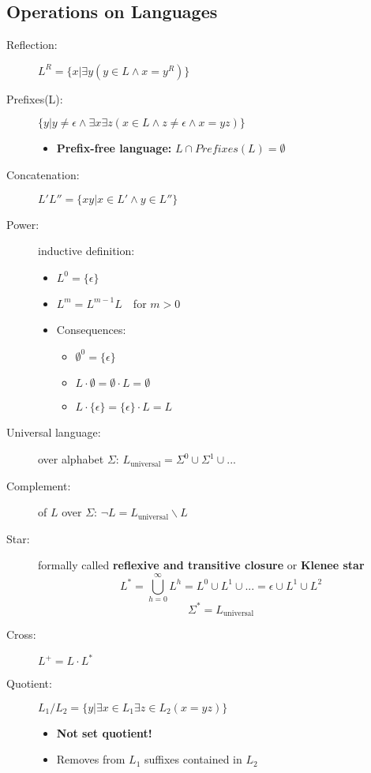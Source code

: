 \documentclass{article}
\begin{document}
\subsection{Operations on Languages}
\begin{description}
\item[Reflection:] $L^R=\{ x|\exists y\left(y\in L \wedge x=y^R\right)\}$
\item[Prefixes(L):] $\{y|y\neq \epsilon \wedge \exists x \exists z \left(x \in L \wedge z \neq \epsilon \wedge x=yz \right)\}$
	\begin{itemize}
	\item \textbf{Prefix-free language: } $L \cap Prefixes(L)=\emptyset$
	\end{itemize}
\item[Concatenation:] $L'L''=\{xy|x \in L' \wedge y \in L''\}$
\item[Power:] inductive definition:
	\begin{itemize}
	\item $L^0=\{\epsilon\}$
	\item $L^m=L^{m-1}L	\quad$for $m>0$
	\item Consequences:
		\begin{itemize}
		\item $\emptyset ^0=\{\epsilon\}$
		\item $L \cdot \emptyset = \emptyset \cdot L = \emptyset$
		\item $L \cdot \{\epsilon\} = \{\epsilon\} \cdot L = L$
		\end{itemize}
	\end{itemize}
\item [Universal language:] over alphabet $\Sigma$: $L_{\text{universal}}=\Sigma^0 \cup \Sigma ^1 \cup ...$
\item[Complement:] of $L$ over $\Sigma$: $\neg L=L_{\text{universal}} \backslash L$
\item[Star:] formally called \textbf{reflexive and transitive closure} or \textbf{Klenee star} 
\[L^*=\bigcup_{h=0}^{\infty}L^h=L^0 \cup L^1 \cup ... = \epsilon \cup L^1 \cup L^2\]
\[\Sigma^*=L_{\text{universal}}\]
\item[Cross:] $L^+=L \cdot L^*$
\item[Quotient:] $L_1 / L_2 =
\{y| \exists x \in L_1 \exists z \in L_2 (x=yz)\}$
	\begin{itemize}
	\item \textbf{Not set quotient!}
	\item Removes from $L_1$ suffixes contained in $L_2$
	\end{itemize}
\end{description}
\end{document}
